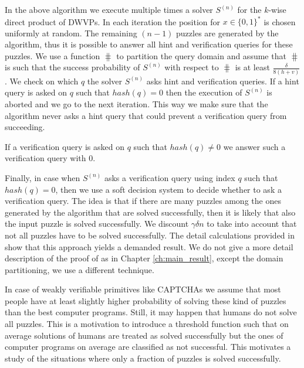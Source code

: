 In the above algorithm we execute multiple times a solver $S^{(n)}$ for the $k$-wise direct product of DWVPs.
In each iteration the position for $x \in \{0,1\}^{*}$ is chosen uniformly at random.
The remaining $(n-1)$ puzzles are generated by the algorithm, thus it is possible to answer
all hint and verification queries for these puzzles.
We use a function $\hash$ to partition the query domain and assume that $\hash$ is such
that the success probability of $S^{(n)}$ with respect to $\hash$ is at least $\frac{\delta}{8(h+v)}$.
We check on which $q$ the solver $S^{(n)}$ asks hint and verification queries.
If a hint query is asked on $q$ such that $hash(q) = 0$ then the execution of $S^{(n)}$
is aborted and we go to the next iteration. This way we make sure that the algorithm
never asks a hint query that could prevent a verification query from succeeding.

If a verification query is asked on $q$ such that $hash(q) \neq 0$ we answer such a verification
query with $0$.

Finally, in case when $S^{(n)}$ asks a verification query using index $q$ such that $hash(q) = 0$, then
we use a soft decision system to decide whether to ask a verification query.
The idea is that if there are many puzzles among the ones generated by the algorithm that are solved successfully,
then it is likely that also the input puzzle is solved successfully.
We discount $\gamma\delta n$ to take into account that not all puzzles have to be solved successfully.
The detail calculations provided in \cite{Dodis:2009:SAI:1530441.1530450} show that this approach
yields a demanded result. We do not give a more detail description of the proof of \cite{Dodis:2009:SAI:1530441.1530450} as
in Chapter \ref{ch:main_result}, except the domain partitioning, we use a different technique.

In case of weakly verifiable primitives like CAPTCHAs we assume that most people have at least slightly higher probability of solving
these kind of puzzles than the best computer programs. Still, it may happen that humans do not solve all puzzles.
This is a motivation to introduce a threshold function such that on average solutions of humans are treated as solved successfully
but the ones of computer programs on average are classified as not successful.
This motivates a study of the situations where only a fraction of puzzles is solved successfully.


